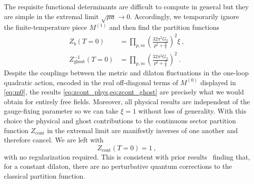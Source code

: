 \documentclass[12pt]{article}
\begin{document}
The requisite functional determinants are difficult to compute in general but they are simple in the extremal limit $\sqrt{\mu a} \to 0$. 
Accordingly, we temporarily ignore the finite-temperature piece $M^{(1)}$ and then find the partition functions
\begin{equation}\begin{aligned}
	Z_b(T = 0) &= \prod_{p ,m}\left(\frac{32 \pi^2 G_2}{p^2 + \frac{9}{4}}\right)^2\xi~, \\
	Z_\text{ghost}^{-1}(T = 0) &= \prod_{p,m}\left(\frac{32 \pi^2 G_2}{p^2 + \frac{9}{4}}\right)^2~.
\label{eq:zcont_phys,eq:zcont_ghost}
\end{aligned}\end{equation}
Despite the couplings between the metric and dilaton fluctuations in the one-loop quadratic action, encoded in the real off-diagonal terms of $M^{(0)}$ displayed in \eqref{eq:m0}, the results \eqref{eq:zcont_phys,eq:zcont_ghost} are precisely what we would obtain for entirely free fields.  Moreover, all physical results are independent of the gauge-fixing parameter
so we can take  $\xi = 1$ without loss of generality. With this choice the physical and ghost contributions to the continuous sector partition function $Z_\text{cont}$ in the extremal limit are manifestly inverses of one another and therefore cancel.  We are left with 
\begin{equation}
	Z_\text{cont}(T = 0) = 1~,
\end{equation} 
with no regularization required.  This is consistent with prior results~\cite{Grumiller:2015vaa} finding that, for a constant dilaton, there are no perturbative quantum corrections to the classical partition function.  
\end{document}
